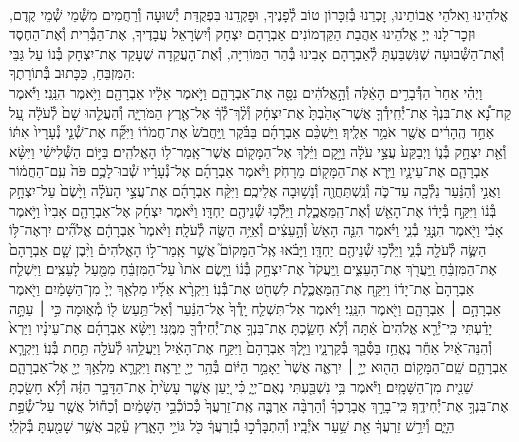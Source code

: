 \documentclass[twoside, openany, parskip=half, 11pt]{book}
\begin{document}
\\
אֱלֹהֵינוּ וֵאלֹהֵי אֲבוֹתֵינוּ, זׇכְרֵנוּ בְּ֯זִכָּרוֹן טוֹב לְ֯פָנֶיךָ, וּפׇקְדֵנוּ בִּפְקֻדַּת יְ֯שׁוּעָה וְ֯רַחֲמִים מִשְּׁ֯מֵי שְׁ֯מֵי קֶדֶם, וּזְכׇר־לָנוּ יְיָ אֱלֹהֵינוּ אַהֲבַת הַקַּדְמוֹנִים אַבְרָהָם יִצְחָק וְ֯יִשְׂרָאֵל עֲבָדֶיךָ, אֶת־הַבְּ֯רִית וְ֯אֶת־הַחֶסֶד וְ֯אֶת־הַשְּׁ֯בוּעָה שֶׁנִּשְׁבַּעְתָּ לְ֯אַבְרָהָם אָבִינוּ בְּ֯הַר הַמּוֹרִיָּה, וְ֯אֶת־הָעֲקֵדָה שֶׁעָקַד אֶת־יִצְחָק בְּ֯נוֹ עַל גַּבֵּי הַמִּזְבֵּחַ, כַּכָּתוּב בְּ֯תוֹרָתֶךָ:\\
וַיְהִ֗י אַחַר֙ הַדְּ֯בָרִ֣ים הָאֵ֔לֶּה  וְ֯הָ֣אֱלֹהִ֔ים נִסָּ֖ה אֶת־אַבְרָהָ֑ם וַיֹּ֣אמֶר אֵלָ֔יו אַבְרָהָ֖ם וַיֹּ֥אמֶר הִנֵּֽנִי׃ וַיֹּ֡אמֶר קַח־נָ֠א אֶת־בִּנְךָ֨ אֶת־יְ֯חִֽידְ֯ךָ֤ אֲשֶׁר־אָהַ֙בְתָּ֙ אֶת־יִצְחָ֔ק וְ֯לֶ֨ךְ־לְ֯ךָ֔ אֶל־אֶ֖רֶץ הַמֹּרִיָּ֑ה וְ֯הַעֲלֵ֤הוּ שָׁם֙ לְ֯עֹלָ֔ה עַ֚ל אַחַ֣ד הֶֽהָרִ֔ים אֲשֶׁ֖ר אֹמַ֥ר אֵלֶֽיךָ׃ וַיַּשְׁכֵּ֨ם אַבְרָהָ֜ם בַּבֹּ֗קֶר וַֽיַּחֲבֹשׁ֙ אֶת־חֲמֹר֔וֹ וַיִּקַּ֞ח אֶת־שְׁ֯נֵ֤י נְ֯עָרָיו֙ אִתּ֔וֹ וְ֯אֵ֖ת יִצְחָ֣ק בְּ֯נ֑וֹ וַיְבַקַּע֙ עֲצֵ֣י עֹלָ֔ה וַיָּ֣קׇם וַיֵּ֔לֶךְ אֶל־הַמָּק֖וֹם אֲשֶׁר־אָֽמַר־ל֥וֹ הָאֱלֹהִֽים׃ בַּיּ֣וֹם הַשְּׁ֯לִישִׁ֗י וַיִּשָּׂ֨א אַבְרָהָ֧ם אֶת־עֵינָ֛יו וַיַּ֥רְא אֶת־הַמָּק֖וֹם מֵרָחֹֽק׃ וַיֹּ֨אמֶר אַבְרָהָ֜ם אֶל־נְ֯עָרָ֗יו שְׁ֯בוּ־לָכֶ֥ם פֹּה֙ עִֽם־הַחֲמ֔וֹר וַאֲנִ֣י וְ֯הַנַּ֔עַר נֵלְ֯כָ֖ה עַד־כֹּ֑ה וְ֯נִֽשְׁתַּחֲוֶ֖ה וְ֯נָשׁ֥וּבָה אֲלֵיכֶֽם׃ וַיִּקַּ֨ח אַבְרָהָ֜ם אֶת־עֲצֵ֣י הָעֹלָ֗ה וַיָּ֙שֶׂם֙ עַל־יִצְחָ֣ק בְּ֯נ֔וֹ וַיִּקַּ֣ח בְּ֯יָד֔וֹ אֶת־הָאֵ֖שׁ וְ֯אֶת־הַֽמַּאֲכֶ֑לֶת וַיֵּלְ֯כ֥וּ שְׁ֯נֵיהֶ֖ם יַחְדָּֽו׃ וַיֹּ֨אמֶר יִצְחָ֜ק אֶל־אַבְרָהָ֤ם אָבִיו֙ וַיֹּ֣אמֶר אָבִ֔י וַיֹּ֖אמֶר הִנֶּ֣נִּֽי בְ֯נִ֑י וַיֹּ֗אמֶר הִנֵּ֤ה הָאֵשׁ֙ וְ֯הָ֣עֵצִ֔ים וְ֯אַיֵּ֥ה הַשֶּׂ֖ה לְ֯עֹלָֽה׃ וַיֹּ֙אמֶר֙ אַבְרָהָ֔ם אֱלֹהִ֞ים יִרְאֶה־לּ֥וֹ הַשֶּׂ֛ה לְ֯עֹלָ֖ה בְּ֯נִ֑י וַיֵּלְ֯כ֥וּ שְׁ֯נֵיהֶ֖ם יַחְדָּֽו׃ וַיָּבֹ֗אוּ אֶֽל־הַמָּקוֹם֮ אֲשֶׁ֣ר אָֽמַר־ל֣וֹ הָאֱלֹהִים֒ וַיִּ֨בֶן שָׁ֤ם אַבְרָהָם֙ אֶת־הַמִּזְבֵּ֔חַ וַֽיַּעֲרֹ֖ךְ אֶת־הָעֵצִ֑ים וַֽיַּעֲקֹד֙ אֶת־יִצְחָ֣ק בְּ֯נ֔וֹ וַיָּ֤שֶׂם אֹתוֹ֙ עַל־הַמִּזְבֵּ֔חַ מִמַּ֖עַל לָעֵצִֽים׃ וַיִּשְׁלַ֤ח אַבְרָהָם֙ אֶת־יָד֔וֹ וַיִּקַּ֖ח אֶת־הַֽמַּאֲכֶ֑לֶת לִשְׁחֹ֖ט אֶת־בְּ֯נֽוֹ׃ וַיִּקְרָ֨א אֵלָ֜יו מַלְאַ֤ךְ יְיָ֙ מִן־הַשָּׁמַ֔יִם וַיֹּ֖אמֶר אַבְרָהָ֣ם ׀ אַבְרָהָ֑ם וַיֹּ֖אמֶר הִנֵּֽנִי׃ וַיֹּ֗אמֶר אַל־תִּשְׁלַ֤ח יָֽדְ֯ךָ֙ אֶל־הַנַּ֔עַר וְ֯אַל־תַּ֥עַשׂ ל֖וֹ מְ֯א֑וּמָה כִּ֣י ׀ עַתָּ֣ה יָדַ֗עְתִּי כִּֽי־יְ֯רֵ֤א אֱלֹהִים֙ אַ֔תָּה וְ֯לֹ֥א חָשַׂ֛כְתָּ אֶת־בִּנְךָ֥ אֶת־יְ֯חִידְ֯ךָ֖ מִמֶּֽנִּי׃ וַיִּשָּׂ֨א אַבְרָהָ֜ם אֶת־עֵינָ֗יו וַיַּרְא֙ וְ֯הִנֵּה־אַ֔יִל אַחַ֕ר נֶאֱחַ֥ז בַּסְּ֯בַ֖ךְ בְּ֯קַרְנָ֑יו וַיֵּ֤לֶךְ אַבְרָהָם֙ וַיִּקַּ֣ח אֶת־הָאַ֔יִל וַיַּעֲלֵ֥הוּ לְ֯עֹלָ֖ה תַּ֥חַת בְּ֯נֽוֹ׃ וַיִּקְרָ֧א אַבְרָהָ֛ם שֵֽׁם־הַמָּק֥וֹם הַה֖וּא יְיָ֣ ׀ יִרְאֶ֑ה אֲשֶׁר֙ יֵאָמֵ֣ר הַיּ֔וֹם בְּ֯הַ֥ר יְיָ֖ יֵרָאֶֽה׃ וַיִּקְרָ֛א מַלְאַ֥ךְ יְיָ֖ אֶל־אַבְרָהָ֑ם שֵׁנִ֖ית מִן־הַשָּׁמָֽיִם׃ וַיֹּ֕אמֶר בִּ֥י נִשְׁבַּ֖עְתִּי נְאֻם־יְיָ֑ כִּ֗י יַ֚עַן אֲשֶׁ֤ר עָשִׂ֙יתָ֙ אֶת־הַדָּבָ֣ר הַזֶּ֔ה וְ֯לֹ֥א חָשַׂ֖כְתָּ אֶת־בִּנְךָ֥ אֶת־יְ֯חִידֶֽךָ׃ כִּֽי־בָרֵ֣ךְ אֲבָרֶכְךָ֗ וְ֯הַרְבָּ֨ה אַרְבֶּ֤ה אֶֽת־זַרְעֲךָ֙ כְּ֯כוֹכְ֯בֵ֣י הַשָּׁמַ֔יִם וְ֯כַח֕וֹל אֲשֶׁ֖ר עַל־שְׂ֯פַ֣ת הַיָּ֑ם וְ֯יִרַ֣שׁ זַרְעֲךָ֔ אֵ֖ת שַׁ֥עַר אֹיְ֯בָֽיו׃ וְ֯הִתְבָּרְ֯כ֣וּ בְ֯זַרְעֲךָ֔ כֹּ֖ל גּוֹיֵ֣י הָאָ֑רֶץ עֵ֕קֶב אֲשֶׁ֥ר שָׁמַ֖עְתָּ בְּ֯קֹלִֽי׃ 
\end{document}
